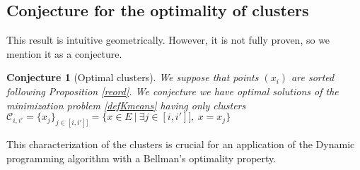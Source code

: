 \documentclass{meta}
\def\CC{{\mathcal{C}}}
\newtheorem{conj}{Conjecture}
\begin{document}
\subsection{Conjecture for the optimality of clusters}


This result is intuitive geometrically.
However, it is not fully proven, so we mention it as a conjecture. 



\begin{conj}[Optimal clusters]\label{propOptimality}
We suppose that points $(x_i)$ are sorted following Proposition \ref{reord}.
We conjecture we have optimal solutions of the minimization problem \ref{defKmeans} having only clusters  $\CC_{i,i'} = 
\{x_j\}_{j \in \![i,i']\!]}= \{x \in E \: | \: \exists j \in \![i,i']\!],\: x = x_j \} $
\end{conj}


This characterization of the  clusters is crucial
for an application of the Dynamic programming algorithm with a Bellman's optimality property.
\end{document}
